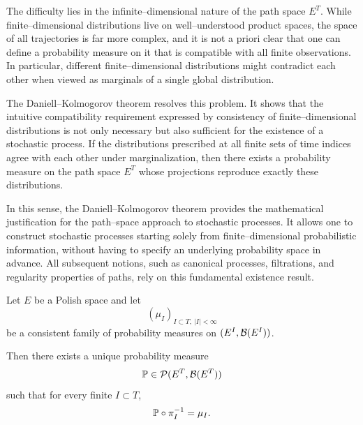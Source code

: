 The difficulty lies in the infinite--dimensional nature of the path space $E^T$. While
finite--dimensional distributions live on well--understood product spaces, the space of
all trajectories is far more complex, and it is not a priori clear that one can define a
probability measure on it that is compatible with all finite observations. In particular,
different finite--dimensional distributions might contradict each other when viewed as
marginals of a single global distribution.

The Daniell--Kolmogorov theorem resolves this problem. It shows that the intuitive
compatibility requirement expressed by consistency of finite--dimensional distributions
is not only necessary but also sufficient for the existence of a stochastic process. If
the distributions prescribed at all finite sets of time indices agree with each other
under marginalization, then there exists a probability measure on the path space $E^T$
whose projections reproduce exactly these distributions.

In this sense, the Daniell--Kolmogorov theorem provides the mathematical justification for
the path--space approach to stochastic processes. It allows one to construct stochastic
processes starting solely from finite--dimensional probabilistic information, without
having to specify an underlying probability space in advance. All subsequent notions,
such as canonical processes, filtrations, and regularity properties of paths, rely on this
fundamental existence result.

\begin{theorem}
Let $E$ be a Polish space and let
\[
(\mu_I)_{I \subset T,\ |I|<\infty}
\]
be a consistent family of probability measures on $(E^I,\mathcal{B}(E^I))$.

Then there exists a unique probability measure
\[
\mathbb{P} \in \mathcal{P}(E^T,\mathcal{B}(E^T))
\]
such that for every finite $I \subset T$,
\[
\mathbb{P} \circ \pi_I^{-1} = \mu_I.
\]
\end{theorem}

